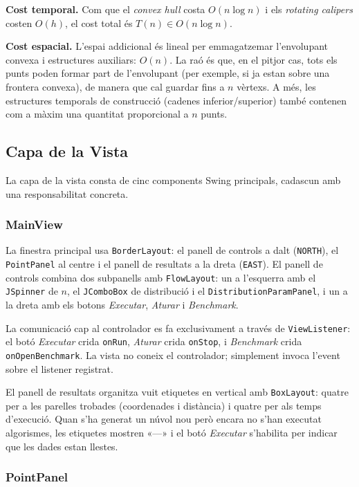 \documentclass[conference,compsoc]{IEEEtran}
\begin{document}
\textbf{Cost temporal.} Com que el \textit{convex hull} costa
$O(n \log n)$ i els \textit{rotating calipers} costen $O(h)$,
el cost total és $T(n)\in O(n \log n)$.

\textbf{Cost espacial.} L'espai addicional és lineal per
emmagatzemar l'envolupant convexa i estructures auxiliars:
$O(n)$. La raó és que, en el pitjor cas, tots els punts poden formar
part de l'envolupant (per exemple, si ja estan sobre una frontera
convexa), de manera que cal guardar fins a $n$ vèrtexs. A més, les
estructures temporals de construcció (cadenes inferior/superior) també
contenen com a màxim una quantitat proporcional a $n$ punts.

\subsection{Capa de la Vista}

La capa de la vista consta de cinc components Swing principals, cadascun
amb una responsabilitat concreta.

\subsubsection{MainView}

La finestra principal usa \texttt{BorderLayout}: el panell de controls a
dalt (\texttt{NORTH}), el \texttt{PointPanel} al centre i el panell de
resultats a la dreta (\texttt{EAST}). El panell de controls combina
dos subpanells amb \texttt{FlowLayout}: un a l'esquerra amb el
\texttt{JSpinner} de $n$, el \texttt{JComboBox} de distribució i el
\texttt{DistributionParamPanel}, i un a la dreta amb els botons
\textit{Executar}, \textit{Aturar} i \textit{Benchmark}.

La comunicació cap al controlador es fa exclusivament a través de
\texttt{ViewListener}: el botó \textit{Executar} crida \texttt{onRun},
\textit{Aturar} crida \texttt{onStop}, i \textit{Benchmark} crida
\texttt{onOpenBenchmark}. La vista no coneix el controlador; simplement
invoca l'event sobre el listener registrat.

El panell de resultats organitza vuit etiquetes en vertical amb
\texttt{BoxLayout}: quatre per a les parelles trobades (coordenades i
distància) i quatre per als temps d'execució. Quan s'ha generat un
núvol nou però encara no s'han executat algorismes, les etiquetes
mostren «---» i el botó \textit{Executar} s'habilita per indicar que
les dades estan llestes.

\subsubsection{PointPanel}
\end{document}
